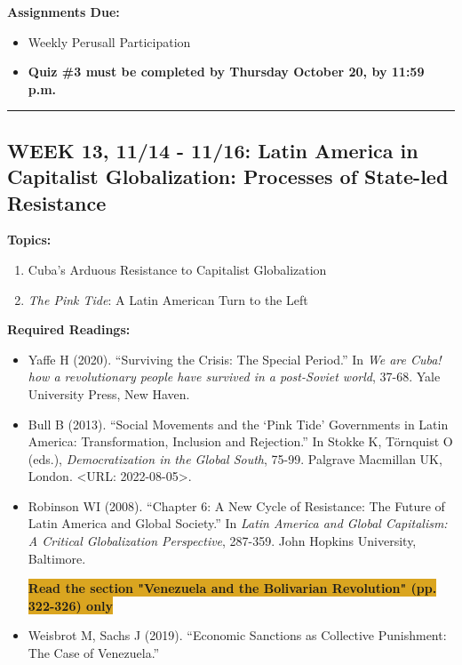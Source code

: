 \documentclass[11pt,]{article}
\providecommand{\tightlist}{%
  \setlength{\itemsep}{0pt}\setlength{\parskip}{0pt}}
\begin{document}
\textbf{Assignments Due:}

\begin{itemize}
\tightlist
\item
  Weekly Perusall Participation
\item
  \textbf{Quiz \#3 must be completed by Thursday October 20, by 11:59
  p.m.}
\end{itemize}

\bigbreak
\hrule

\hypertarget{week-13-1114---1116-latin-america-in-capitalist-globalization-processes-of-state-led-resistance}{%
\subsection{WEEK 13, 11/14 - 11/16: Latin America in Capitalist
Globalization: Processes of State-led
Resistance}\label{week-13-1114---1116-latin-america-in-capitalist-globalization-processes-of-state-led-resistance}}

\textbf{Topics:}

\begin{enumerate}
\def\labelenumi{(\arabic{enumi})}
\tightlist
\item
  Cuba's Arduous Resistance to Capitalist Globalization
\item
  \emph{The Pink Tide}: A Latin American Turn to the Left
\end{enumerate}

\textbf{Required Readings:}

\begin{itemize}
\item
  Yaffe H (2020). ``Surviving the Crisis: The Special Period.'' In
  \emph{We are Cuba! how a revolutionary people have survived in a
  post-Soviet world}, 37-68. Yale University Press, New Haven.
\item
  Bull B (2013). ``Social Movements and the `Pink Tide' Governments in
  Latin America: Transformation, Inclusion and Rejection.'' In Stokke K,
  Törnquist O (eds.), \emph{Democratization in the Global South}, 75-99.
  Palgrave Macmillan UK, London. \textless URL: 2022-08-05\textgreater.
\item
  Robinson WI (2008). ``Chapter 6: A New Cycle of Resistance: The Future
  of Latin America and Global Society.'' In \emph{Latin America and
  Global Capitalism: A Critical Globalization Perspective}, 287-359.
  John Hopkins University, Baltimore.

  \colorbox{Goldenrod}{\bf{Read the section "Venezuela and the Bolivarian Revolution" (pp. 322-326) only}}
\item
  Weisbrot M, Sachs J (2019). ``Economic Sanctions as Collective
  Punishment: The Case of Venezuela.''
\end{itemize}
\end{document}
